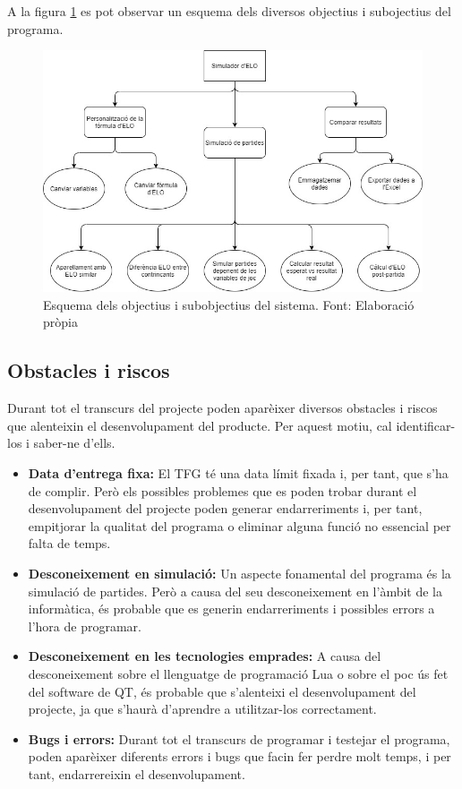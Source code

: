 \documentclass[a4paper]{article}
\begin{document}
A la figura \ref{fig:EsquemaObjectius} es pot observar un esquema dels diversos objectius i subojectius del programa.

\begin{figure}[H]
    \centering
    \includegraphics[width=1.15\textwidth]{images/FuncionsEsquema.jpg}
    \caption{Esquema dels objectius i subobjectius del sistema. Font: Elaboració pròpia}
    \label{fig:EsquemaObjectius}
\end{figure}

\subsection{Obstacles i riscos}
Durant tot el transcurs del projecte poden aparèixer diversos obstacles i riscos que alenteixin el desenvolupament del producte. Per aquest motiu, cal identificar-los i saber-ne d'ells.

\begin{itemize}
    \item \textbf{Data d'entrega fixa:} El TFG té una data límit fixada i, per tant, que s'ha de complir. Però els possibles problemes que es poden trobar durant el desenvolupament del projecte poden generar endarreriments i, per tant, empitjorar la qualitat del programa o eliminar alguna funció no essencial per falta de temps.
    \item \textbf{Desconeixement en simulació:} Un aspecte fonamental del programa és la simulació de partides. Però a causa del seu desconeixement en l'àmbit de la informàtica, és probable que es generin endarreriments i possibles errors a l'hora de programar.
    \item \textbf{Desconeixement en les tecnologies emprades:} A causa del desconeixement sobre el llenguatge de programació Lua o sobre el poc ús fet del software de QT, és probable que s'alenteixi el desenvolupament del projecte, ja que s'haurà d'aprendre a utilitzar-los correctament.
    \item \textbf{Bugs i errors:} Durant tot el transcurs de programar i testejar el programa, poden aparèixer diferents errors i bugs que facin fer perdre molt temps, i per tant, endarrereixin el desenvolupament.
\end{itemize}
\end{document}
